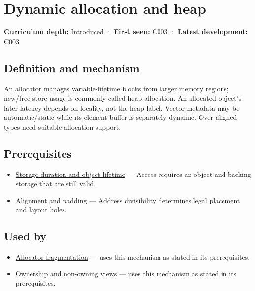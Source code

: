 \hypertarget{appendix-c3480f7d9ff3}{}\label{referencestart:appendix-c3480f7d9ff3}
\section{Dynamic allocation and heap}\label{appendix-c3480f7d9ff3-dynamic-allocation-and-heap}

\textbf{Curriculum depth:} Introduced · \textbf{First seen:} C003 · \textbf{Latest development:} C003

\begin{allmightroledefinition}

\subsection{Definition and mechanism}\label{appendix-c3480f7d9ff3-definition-and-mechanism}

An allocator manages variable-lifetime blocks from larger memory regions; new/free-store usage is commonly called heap allocation. An allocated object's later latency depends on locality, not the heap label. Vector metadata may be automatic/static while its element buffer is separately dynamic. Over-aligned types need suitable allocation support.

\end{allmightroledefinition}

\subsection{Prerequisites}\label{appendix-c3480f7d9ff3-prerequisites}

\begin{itemize}
\tightlist
\item
  \hyperref[appendix-0b104bcba06b]{Storage duration and object lifetime} --- Access requires an object and backing storage that are still valid.
\item
  \hyperref[appendix-a1f7c53b4742]{Alignment and padding} --- Address divisibility determines legal placement and layout holes.
\end{itemize}

\subsection{Used by}\label{appendix-c3480f7d9ff3-used-by}

\begin{itemize}
\tightlist
\item
  \hyperref[appendix-a7c50686d81f]{Allocator fragmentation} --- uses this mechanism as stated in its prerequisites.
\item
  \hyperref[appendix-d52e4486f527]{Ownership and non-owning views} --- uses this mechanism as stated in its prerequisites.
\end{itemize}

